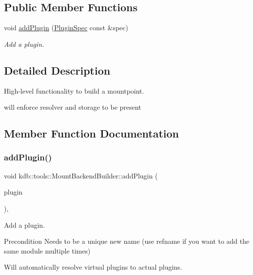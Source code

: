 \subsection*{Public Member Functions}
\begin{DoxyCompactItemize}
\item 
void \mbox{\hyperlink{classkdb_1_1tools_1_1MountBackendBuilder_a2603e75436a49fc66696c1b41b27efb9}{add\+Plugin}} (\mbox{\hyperlink{classkdb_1_1tools_1_1PluginSpec}{Plugin\+Spec}} const \&spec)
\begin{DoxyCompactList}\small\item\em Add a plugin. \end{DoxyCompactList}\end{DoxyCompactItemize}


\subsection{Detailed Description}
High-\/level functionality to build a mountpoint. 

will enforce resolver and storage to be present 

\subsection{Member Function Documentation}
\mbox{\label{classkdb_1_1tools_1_1MountBackendBuilder_a2603e75436a49fc66696c1b41b27efb9}} 
\subsubsection{\texorpdfstring{addPlugin()}{addPlugin()}}
{\footnotesize\ttfamily void kdb\+::tools\+::\+Mount\+Backend\+Builder\+::add\+Plugin (\begin{DoxyParamCaption}\item[{\mbox{\hyperlink{classkdb_1_1tools_1_1PluginSpec}{Plugin\+Spec}} const \&}]{plugin }\end{DoxyParamCaption})\hspace{0.3cm}{\ttfamily [inline]}, {\ttfamily [virtual]}}



Add a plugin. 

\begin{DoxyPrecond}{Precondition}
Needs to be a unique new name (use refname if you want to add the same module multiple times)
\end{DoxyPrecond}
Will automatically resolve virtual plugins to actual plugins.

